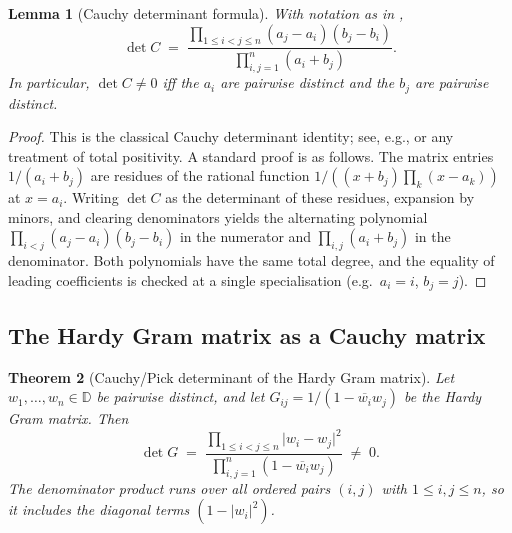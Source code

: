 \documentclass[12pt]{article}
\newtheorem{theorem}{Theorem}[section]
\newtheorem{lemma}[theorem]{Lemma}
\theoremstyle{definition}
\theoremstyle{remark}
\newcommand{\D}{\mathbb{D}}
\newcommand{\abs}[1]{\lvert #1 \rvert}
\newcommand{\conj}[1]{\overline{#1}}
\begin{document}
\begin{lemma}[Cauchy determinant formula]\label{lem:cauchy-det}
With notation as in ,
\[
  \det C\;=\;\frac{\prod_{1\le i<j\le n}(a_{j}-a_{i})(b_{j}-b_{i})}
                   {\prod_{i,j=1}^{n}(a_{i}+b_{j})}.
\]
In particular, $\det C\neq0$ iff the $a_{i}$ are pairwise distinct and the
$b_{j}$ are pairwise distinct.
\end{lemma}

\begin{proof}
This is the classical Cauchy determinant identity; see, e.g.,
\cite{HornJohnson} or any treatment of total positivity. A standard
proof is as follows. The matrix entries $1/(a_{i}+b_{j})$ are residues
of the rational function $1/((x+b_{j})\prod_{k}(x-a_{k}))$ at $x=a_{i}$.
Writing $\det C$ as the determinant of these residues, expansion by
minors, and clearing denominators yields the alternating polynomial
$\prod_{i<j}(a_{j}-a_{i})(b_{j}-b_{i})$ in the numerator and
$\prod_{i,j}(a_{i}+b_{j})$ in the denominator. Both polynomials have
the same total degree, and the equality of leading coefficients is
checked at a single specialisation (e.g.~$a_{i}=i$, $b_{j}=j$).
\end{proof}

\subsection{The Hardy Gram matrix as a Cauchy matrix}

\begin{theorem}[Cauchy/Pick determinant of the Hardy Gram matrix]\label{thm:gram-cauchy}
Let $w_{1},\dots,w_{n}\in\D$ be pairwise distinct, and let
$G_{ij}=1/(1-\conj{w_{i}}w_{j})$ be the Hardy Gram matrix. Then
\begin{equation}\label{eq:cauchy-det}
  \det G\;=\;\frac{\prod_{1\le i<j\le n}\abs{w_{i}-w_{j}}^{2}}
                   {\prod_{i,j=1}^{n}(1-\conj{w_{i}}w_{j})}\;\neq\;0.
\end{equation}
The denominator product runs over all ordered pairs $(i,j)$ with
$1\le i,j\le n$, so it includes the diagonal terms $(1-\abs{w_{i}}^{2})$.
\end{theorem}
\end{document}
